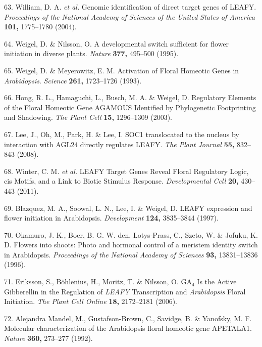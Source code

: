 \documentclass[12pt,]{book}
\begin{document}
\hypertarget{ref-william_genomic_2004}{}
63. William, D. A. \emph{et al.} Genomic identification of direct target
genes of LEAFY. \emph{Proceedings of the National Academy of Sciences of
the United States of America} \textbf{101,} 1775--1780 (2004).

\hypertarget{ref-weigel_developmental_1995}{}
64. Weigel, D. \& Nilsson, O. A developmental switch sufficient for
flower initiation in diverse plants. \emph{Nature} \textbf{377,}
495--500 (1995).

\hypertarget{ref-weigel_activation_1993}{}
65. Weigel, D. \& Meyerowitz, E. M. Activation of Floral Homeotic Genes
in \emph{Arabidopsis}. \emph{Science} \textbf{261,} 1723--1726 (1993).

\hypertarget{ref-hong_regulatory_2003}{}
66. Hong, R. L., Hamaguchi, L., Busch, M. A. \& Weigel, D. Regulatory
Elements of the Floral Homeotic Gene AGAMOUS Identified by Phylogenetic
Footprinting and Shadowing. \emph{The Plant Cell} \textbf{15,}
1296--1309 (2003).

\hypertarget{ref-lee_soc1_2008}{}
67. Lee, J., Oh, M., Park, H. \& Lee, I. SOC1 translocated to the
nucleus by interaction with AGL24 directly regulates LEAFY. \emph{The
Plant Journal} \textbf{55,} 832--843 (2008).

\hypertarget{ref-winter_leafy_2011}{}
68. Winter, C. M. \emph{et al.} LEAFY Target Genes Reveal Floral
Regulatory Logic, cis Motifs, and a Link to Biotic Stimulus Response.
\emph{Developmental Cell} \textbf{20,} 430--443 (2011).

\hypertarget{ref-blazquez_leafy_1997}{}
69. Blazquez, M. A., Soowal, L. N., Lee, I. \& Weigel, D. LEAFY
expression and flower initiation in Arabidopsis. \emph{Development}
\textbf{124,} 3835--3844 (1997).

\hypertarget{ref-okamuro_flowers_1996}{}
70. Okamuro, J. K., Boer, B. G. W. den, Lotys-Prass, C., Szeto, W. \&
Jofuku, K. D. Flowers into shoots: Photo and hormonal control of a
meristem identity switch in Arabidopsis. \emph{Proceedings of the
National Academy of Sciences} \textbf{93,} 13831--13836 (1996).

\hypertarget{ref-eriksson_ga4_2006}{}
71. Eriksson, S., Böhlenius, H., Moritz, T. \& Nilsson, O.
GA\(_{\textrm{4}}\) Is the Active Gibberellin in the Regulation of
\emph{LEAFY} Transcription and \emph{Arabidopsis} Floral Initiation.
\emph{The Plant Cell Online} \textbf{18,} 2172--2181 (2006).

\hypertarget{ref-alejandra_mandel_molecular_1992}{}
72. Alejandra Mandel, M., Gustafson-Brown, C., Savidge, B. \& Yanofsky,
M. F. Molecular characterization of the Arabidopsis floral homeotic gene
APETALA1. \emph{Nature} \textbf{360,} 273--277 (1992).
\end{document}
